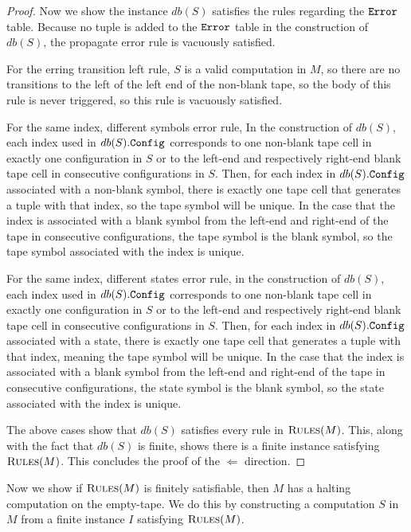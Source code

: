 \begin{proof}
\medskip

Now we show the instance $db(S)$
satisfies the rules
regarding the $\texttt{\tt Error}$ table.
Because no tuple is added to the $\texttt{\tt Error}$ table
in the construction of $db(S)$,
the propagate error rule is vacuously satisfied.

For the erring transition left rule,
$S$ is a valid computation in $M$,
so there are no transitions to the left of the left end of the non-blank tape,
so the body of this rule is never triggered,
so this rule is vacuously satisfied.

For the same index, different symbols error rule,
In the construction of $db(S)$,
each index used in $db(S).\texttt{Config}$
corresponds to one non-blank tape cell
in exactly one configuration in $S$ or to the left-end and respectively right-end blank tape cell in 
consecutive configurations in $S$.
Then, for each index in $db(S).\texttt{Config}$
associated with a non-blank symbol,
there is exactly one tape cell that generates a tuple with that index,
so the tape symbol will be unique.
In the case that the index is associated with a blank symbol
from the left-end and right-end of the tape in consecutive configurations,
the tape symbol is the blank symbol,
so the tape symbol associated with the index is unique.

For the same index, different states error rule,
in the construction of $db(S)$,
each index used in $db(S).\texttt{Config}$ corresponds to one non-blank tape cell
in exactly one configuration in $S$ or to the left-end and respectively right-end blank tape cell in 
consecutive configurations in $S$.
Then, for each index in $db(S).\texttt{Config}$ associated with a state,
there is exactly one tape cell that generates a tuple with that index,
meaning the tape symbol will be unique.
In the case that the index is associated with a blank symbol
from the left-end and right-end of the tape in consecutive configurations,
the state symbol is the blank symbol,
so the state associated with the index is unique.

The above cases show that $db(S)$ satisfies every rule in $\textsc{Rules}(M)$.
This,
along with the fact that $db(S)$ is finite,
shows there is a finite instance satisfying $\textsc{Rules}(M)$.
This concludes the proof of the $\Leftarrow$ direction.
\end{proof}

Now we show if $\textsc{Rules}(M)$ is finitely satisfiable,
then $M$ has a halting computation on the empty-tape.
We do this by constructing a computation $S$ in $M$
from a finite instance $I$ satisfying $\textsc{Rules}(M)$.

